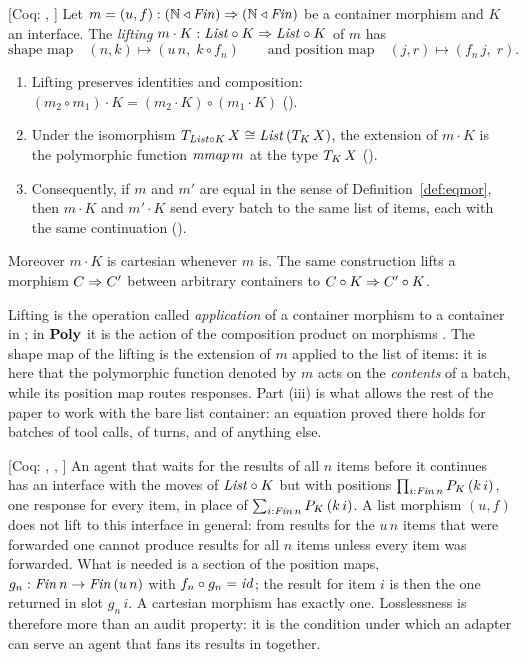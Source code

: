 \documentclass{fundam}
\begin{document}
\begin{proposition}[Lifting]\label{prop:lifting}
  \textsf{[Coq: , ]}
  Let $m = (u, f) : (\mathbb{N} \triangleleft \mathit{Fin}) \Rightarrow (\mathbb{N} \triangleleft \mathit{Fin})$ be a container
  morphism and $K$ an interface.  The \emph{lifting}
  $m \cdot K : \mathit{List} \circ K \Rightarrow \mathit{List} \circ K$ of $m$ has
  \[
    \text{shape map}\quad (n, k) \longmapsto (u\,n,\; k \circ f_n)
    \qquad\text{and position map}\quad (j, r) \longmapsto (f_n\,j,\; r) .
  \]
  \begin{enumerate}[label=(\roman*),leftmargin=2em]
  \item Lifting preserves identities and composition:
    $(m_2 \circ m_1) \cdot K = (m_2 \cdot K) \circ (m_1 \cdot K)$
    ().
  \item Under the isomorphism $T_{\mathit{List} \circ K}\,X \cong \mathit{List}\,(T_{K}\,X)$, the
    extension of $m \cdot K$ is the polymorphic function $\mathit{mmap}\,m$ at the type
    $T_{K}\,X$ ().
  \item Consequently, if $m$ and $m'$ are equal in the sense of
    Definition~\ref{def:eqmor}, then $m \cdot K$ and $m' \cdot K$ send every batch to the
    same list of items, each with the same continuation ().
  \end{enumerate}
  Moreover $m \cdot K$ is cartesian whenever $m$ is.  The same construction lifts a
  morphism $C \Rightarrow C'$ between arbitrary containers to $C \circ K \Rightarrow C' \circ K$.
\end{proposition}

Lifting is the operation called \emph{application} of a container morphism to a container
in \cite[Def.~3.8]{Prince10}; in $\mathbf{Poly}$ it is the action of the composition product on
morphisms \cite{NiuSpivak25}.  The shape map of the lifting is the extension of $m$
applied to the list of items: it is here that the polymorphic function denoted by $m$
acts on the \emph{contents} of a batch, while its position map routes responses.  Part (iii) is what allows the rest of the paper
to work with the bare list container: an equation proved there holds for batches of tool
calls, of turns, and of anything else.

\begin{remark}\label{rem:all}
  \textsf{[Coq: , , ]}
  An agent that waits for the results of all $n$ items before it continues has an
  interface with the moves of $\mathit{List} \circ K$ but with positions
  $\prod_{i : \mathit{Fin}\,n} P_K\,(k\,i)$, one response for every item, in place of
  $\sum_{i:\mathit{Fin}\,n} P_K\,(k\,i)$.  A list morphism $(u,f)$ does not lift to this interface
  in general: from results for the $u\,n$ items that were forwarded one cannot produce
  results for all $n$ items unless every item was forwarded.  What is needed is a section
  of the position maps, $g_n : \mathit{Fin}\,n \to \mathit{Fin}\,(u\,n)$ with $f_n \circ g_n = \mathit{id}$;
  the result for item $i$ is then the one returned in slot $g_n\,i$.  A cartesian
  morphism has exactly one.  Losslessness is therefore more than an audit property: it
  is the condition under which an adapter can serve an agent that fans its results in
  together.
\end{remark}
\end{document}
